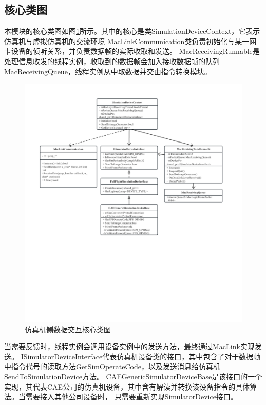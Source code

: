 \subsection{核心类图}

\vspace{7pt}
本模块的核心类图如图\ref{module12}所示。其中的核心是类SimulationDeviceContext，它表示仿真机与虚拟仿真机的交流环境
MacLinkCommunication类负责初始化与某一网卡设备的侦听关系，并负责数据帧的实际收取和发送。
MacReceivingRunnable是处理信息收发的线程实例，收取到的数据帧会加入接收数据帧的队列MacReceivingQueue，线程实例从中取数据并交由指令转换模块。
\begin{figure}[h!]
    \begin{center}
        \includegraphics[width=\textwidth]{pictures/classdiagram1.pdf}
        \caption{仿真机侧数据交互核心类图}
        \label{module12}
    \end{center}
\end{figure}
\par
当需要反馈时，线程实例会调用设备实例中的发送方法，最终通过MacLink实现发送。
ISimulatorDeviceInterface代表仿真机设备类的接口，其中包含了对于数据帧中指令代号的读取方法GetSimOperateCode，以及发送消息给仿真机SendToSimulationDevice方法。
CAEGenericSimulatorDeviceBase是该接口的一个实现，其代表CAE公司的仿真机设备，其中含有解读并转换该设备指令的具体算法。当需要接入其他公司设备时，
只需要重新实现SimulatorDevice接口。

